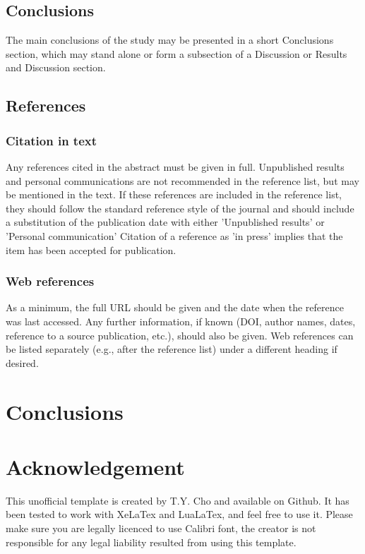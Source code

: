 \documentclass[11pt,a4paper,twoside,twocolumn]{article}
\begin{document}
\subsection{Conclusions}
The main conclusions of the study may be presented in a short Conclusions section, which may stand alone or form a subsection of a Discussion or Results and Discussion section.

\subsection{References} 
\subsubsection{Citation in text}
Any references cited in the abstract must be given in full. Unpublished results and personal communications are not recommended in the reference list, but may be mentioned in the text. If these references are included in the reference list, they should follow the standard reference style of the journal and should include a substitution of the publication date with either 'Unpublished results' or 'Personal communication' Citation of a reference as 'in press' implies that the item has been accepted for publication.

\subsubsection{Web references}
As a minimum, the full URL should be given and the date when the reference was last accessed. Any further information, if known (DOI, author names, dates, reference to a source publication, etc.), should also be given. Web references can be listed separately (e.g., after the reference list) under a different heading if desired. 

\section{Conclusions}

\section*{Acknowledgement}
This unofficial template is created by T.Y. Cho and available on Github. It has been tested to work with XeLaTex and LuaLaTex, and feel free to use it. Please make sure you are legally licenced to use Calibri font, the creator is not responsible for any legal liability resulted from using this template.

\printbibliography
\end{document}
